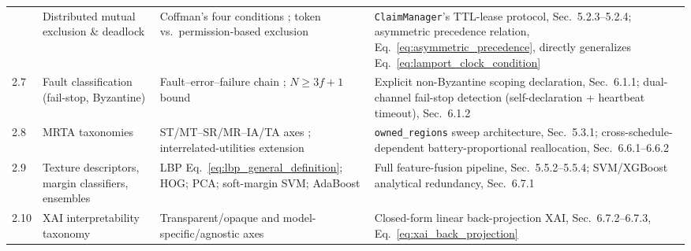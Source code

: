 \begin{table}[p]
\begin{tabularx}{\textwidth}{@{} >{\raggedright\arraybackslash}p{0.6cm} >{\raggedright\arraybackslash}p{3.1cm} X >{\raggedright\arraybackslash}p{6.6cm} @{}}
2.6 & Distributed mutual exclusion \& deadlock & Coffman's four conditions \cite{coffman1971system}; token vs.\ permission-based exclusion & \texttt{ClaimManager}'s TTL-lease protocol, Sec.~5.2.3--5.2.4; asymmetric precedence relation, Eq.~\eqref{eq:asymmetric_precedence}, directly generalizes Eq.~\eqref{eq:lamport_clock_condition} \\ \addlinespace

2.7 & Fault classification (fail-stop, Byzantine) & Fault--error--failure chain \cite{avizienis2004basic}; $N \geq 3f+1$ bound \cite{lamport1982byzantine} & Explicit non-Byzantine scoping declaration, Sec.~6.1.1; dual-channel fail-stop detection (self-declaration + heartbeat timeout), Sec.~6.1.2 \\ \addlinespace

2.8 & MRTA taxonomies & ST/MT--SR/MR--IA/TA axes \cite{gerkey2004formal}; interrelated-utilities extension \cite{korsah2013comprehensive} & \texttt{owned\_regions} sweep architecture, Sec.~5.3.1; cross-schedule-dependent battery-proportional reallocation, Sec.~6.6.1--6.6.2 \\ \addlinespace

2.9 & Texture descriptors, margin classifiers, ensembles & LBP Eq.~\eqref{eq:lbp_general_definition}; HOG; PCA; soft-margin SVM; AdaBoost & Full feature-fusion pipeline, Sec.~5.5.2--5.5.4; SVM/XGBoost analytical redundancy, Sec.~6.7.1 \\ \addlinespace

2.10 & XAI interpretability taxonomy & Transparent/opaque and model-specific/agnostic axes \cite{arrieta2020explainable} & Closed-form linear back-projection XAI, Sec.~6.7.2--6.7.3, Eq.~\eqref{eq:xai_back_projection} \\ \bottomrule

\end{tabularx}
\end{table}

\clearpage